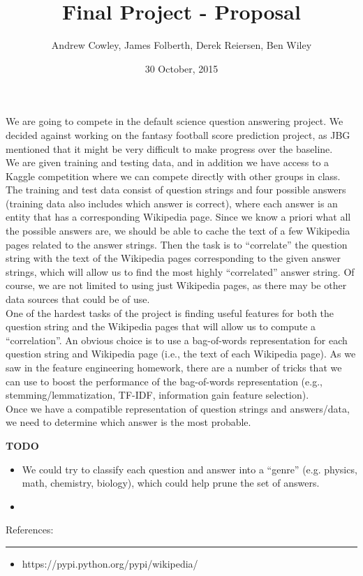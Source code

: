 \documentclass{article}
\title{Final Project - Proposal}
\date{30 October, 2015}
\author{Andrew Cowley, James Folberth, Derek Reiersen, Ben Wiley}
\newcommand{\problemline}{\rule{\textwidth}{0.25mm}}
\theoremstyle{mystuff}
\theoremstyle{myexample}
\theoremstyle{named}
\begin{document}
\maketitle

We are going to compete in the default science question answering project.  We decided against working on the fantasy football score prediction project, as JBG mentioned that it might be very difficult to make progress over the baseline.\\

We are given training and testing data, and in addition we have access to a Kaggle competition where we can compete directly with other groups in class.  The training and test data consist of question strings and four possible answers (training data also includes which answer is correct), where each answer is an entity that has a corresponding Wikipedia page.  Since we know a priori what all the possible answers are, we should be able to cache the text of a few Wikipedia pages related to the answer strings.  Then the task is to ``correlate'' the question string with the text of the Wikipedia pages corresponding to the given answer strings, which will allow us to find the most highly ``correlated'' answer string.  Of course, we are not limited to using just Wikipedia pages, as there may be other data sources that could be of use.\\

One of the hardest tasks of the project is finding useful features for both the question string and the Wikipedia pages that will allow us to compute a ``correlation''.  An obvious choice is to use a bag-of-words representation for each question string and Wikipedia page (i.e., the text of each Wikipedia page).  As we saw in the feature engineering homework, there are a number of tricks that we can use to boost the performance of the bag-of-words representation (e.g., stemming/lemmatization, TF-IDF, information gain feature selection).\\

Once we have a compatible representation of question strings and answers/data, we need to determine which answer is the most probable.

\textbf{TODO}
\begin{itemize}
   \item We could try to classify each question and answer into a ``genre'' (e.g. physics, math, chemistry, biology), which could help prune the set of answers.
   \item 
\end{itemize}

References:\\
\problemline
\begin{itemize}
   \item https://pypi.python.org/pypi/wikipedia/
\end{itemize}

%
%
\end{document}
